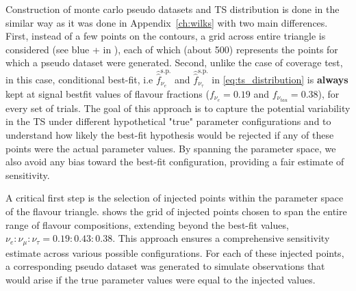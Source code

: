 Construction of monte carlo pseudo datasets and TS distribution is done in the similar way as it was done in Appendix~\ref{ch:wilks} with two main differences. First, instead of a few points on the contours, a grid across entire triangle is considered (see blue + in ), each of which (about 500) represents the points for which a pseudo dataset were generated. Second, unlike the case of coverage test, in this case, conditional best-fit, i.e \(\hat{\hat{f}}_{\nu_e}^{\text{s.p.}}\) and \(\hat{\hat{f}}_{\nu_\tau}^{\text{s.p.}}\) in \ref{eq:ts_distribution} is \textbf{always} kept at signal bestfit values of flavour fractions ($f_{\nu_e} = 0.19$ and $f_{\nu_{tau}}=0.38$), for every set of trials. The goal of this approach is to capture the potential variability in the TS under different hypothetical "true" parameter configurations and to understand how likely the best-fit hypothesis would be rejected if any of these points were the actual parameter values. By spanning the parameter space, we also avoid any bias toward the best-fit configuration, providing a fair estimate of sensitivity.

A critical first step is the selection of injected points within the parameter space of the flavour triangle.  shows the grid of injected points chosen to span the entire range of flavour compositions, extending beyond the best-fit values, $\nu_e:\nu_{\mu}:\nu_{\tau} = 0.19:0.43:0.38$. This approach ensures a comprehensive sensitivity estimate across various possible configurations. For each of these injected points, a corresponding pseudo dataset was generated to simulate observations that would arise if the true parameter values were equal to the injected values.


